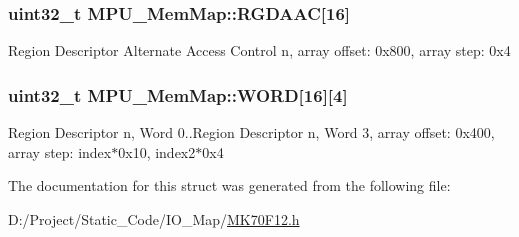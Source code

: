 \subsubsection[{R\+G\+D\+A\+A\+C}]{\setlength{\rightskip}{0pt plus 5cm}uint32\+\_\+t M\+P\+U\+\_\+\+Mem\+Map\+::\+R\+G\+D\+A\+A\+C\mbox{[}16\mbox{]}}\label{struct_m_p_u___mem_map_a7f9c813f610ff2ffa2027cec351b0b1f}
Region Descriptor Alternate Access Control n, array offset\+: 0x800, array step\+: 0x4 \hypertarget{struct_m_p_u___mem_map_ac0f1b1c2b2f2b70a90e02302add086f1}{}
\subsubsection[{W\+O\+R\+D}]{\setlength{\rightskip}{0pt plus 5cm}uint32\+\_\+t M\+P\+U\+\_\+\+Mem\+Map\+::\+W\+O\+R\+D\mbox{[}16\mbox{]}\mbox{[}4\mbox{]}}\label{struct_m_p_u___mem_map_ac0f1b1c2b2f2b70a90e02302add086f1}
Region Descriptor n, Word 0..Region Descriptor n, Word 3, array offset\+: 0x400, array step\+: index$\ast$0x10, index2$\ast$0x4 

The documentation for this struct was generated from the following file\+:\begin{DoxyCompactItemize}
\item 
D\+:/\+Project/\+Static\+\_\+\+Code/\+I\+O\+\_\+\+Map/\hyperlink{_m_k70_f12_8h}{M\+K70\+F12.\+h}\end{DoxyCompactItemize}

